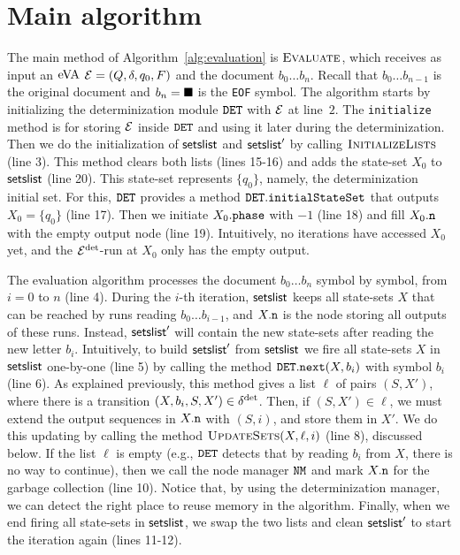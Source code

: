 \section{Main algorithm}
The main method of Algorithm~\ref{alg:evaluation} is $\textproc{Evaluate}$,
which receives as input an $\mathrm{eVA}$ $\mathcal{E} = (Q,\delta,q_0,F)$ and the document $b_0
\ldots b_{n}$. Recall that $b_0 \ldots b_{n-1}$ is the original document and
$b_n = \blacksquare$ is the \texttt{EOF} symbol. The algorithm starts by
initializing the determinization module $\mathtt{DET}$ with $\mathcal{E}$ at line~$2$. The
\texttt{initialize} method is for storing $\mathcal{E}$ inside $\mathtt{DET}$ and using it
later during the determinization. Then we do the initialization of
$\textsf{setslist}$ and $\textsf{setslist}'$ by calling $\textproc{InitializeLists}$
(line 3). This method clears both lists (lines 15-16) and adds the state-set
$X_0$ to $\textsf{setslist}$ (line 20). This state-set represents $\{q_0\}$, namely,
the determinization initial set. For this, $\mathtt{DET}$ provides a method
$\mathtt{DET}.\texttt{initialStateSet}$ that outputs $X_0 = \{q_0\}$ (line 17). Then we
initiate $X_0.\texttt{phase}$ with $-1$ (line 18) and fill $X_0.\mathtt{n}$ with the empty
output node (line 19). Intuitively, no iterations have accessed $X_0$ yet, and
the $\mathcal{E}^{{\operatorname{det}}}$-run at $X_0$ only has the empty output.

The evaluation algorithm processes the document $b_0 \ldots b_{n}$ symbol by
symbol, from $i=0$ to $n$ (line 4). During the $i$-th iteration, $\textsf{setslist}$
keeps all state-sets $X$ that can be reached by runs reading $b_0\ldots
b_{i-1}$, and $X.\mathtt{n}$ is the node storing all outputs of these runs. Instead,
$\textsf{setslist}'$ will contain the new state-sets after reading the new letter
$b_i$. Intuitively, to build $\textsf{setslist}'$ from $\textsf{setslist}$ we fire all
state-sets $X$ in $\textsf{setslist}$ one-by-one (line 5) by calling the method
$\mathtt{DET}.\texttt{next}(X,b_i)$ with symbol $b_i$ (line 6). As explained
previously, this method gives a list $\ell$ of pairs $(S, X')$, where there is a
transition $(X, b_i, S, X') \in \delta^{{\operatorname{det}}}$. Then, if $(S, X') \in \ell$, we
must extend the output sequences in $X.\mathtt{n}$ with $(S, i)$, and store them in
$X'$. We do this updating by calling the method
$\textproc{UpdateSets}(X,\ell,i)$ (line 8), discussed below. If the list $\ell$
is empty (e.g., $\mathtt{DET}$ detects that by reading $b_i$ from $X$, there is no way
to continue), then we call the node manager $\mathtt{NM}$ and mark $X.\mathtt{n}$ for the
garbage collection (line 10). Notice that, by using the determinization manager,
we can detect the right place to reuse memory in the algorithm. Finally, when we
end firing all state-sets in $\textsf{setslist}$, we swap the two lists and clean
$\textsf{setslist}'$ to start the iteration again (lines 11-12).

